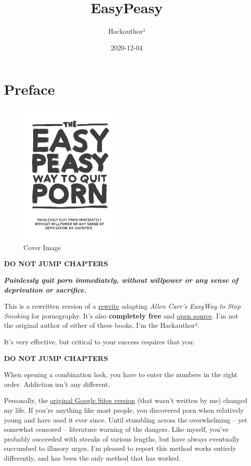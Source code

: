 \documentclass[
]{book}
\title{EasyPeasy}
\author{Hackauthor²}
\date{2020-12-04}
\begin{document}
\maketitle

{
\setcounter{tocdepth}{1}
\tableofcontents
}
\hypertarget{preface}{%
\chapter*{Preface}\label{preface}}

\begin{figure}
\centering
\includegraphics[width=0.45\textwidth,height=0.45\textheight]{images/easypeasy.jpg}
\caption{Cover Image}
\end{figure}

{\textbf{DO NOT JUMP CHAPTERS}}

\textbf{\emph{Painlessly quit porn immediately, without willpower or any sense of deprivation or sacrifice.}}

This is a rewritten version of a \href{https://sites.google.com/site/hackbookeasypeasy}{rewrite} adapting \emph{Allen Carr's EasyWay to Stop Smoking} for pornography. It's also \textbf{completely free} and \href{https://gitlab.com/snuggy/easypeasy}{open source}. I'm not the original author of either of these books, I'm the Hackauthor².

It's very effective, but critical to your success requires that you:

{\textbf{DO NOT JUMP CHAPTERS}}

When opening a combination lock, you have to enter the numbers in the right order. Addiction isn't any different.

Personally, the \href{https://sites.google.com/site/hackbookeasypeasy}{original Google Sites version} (that wasn't written by me) changed my life. If you're anything like most people, you discovered porn when relatively young and have used it ever since. Until stumbling across the overwhelming -- yet somewhat censored -- literature warning of the dangers. Like myself, you've probably succeeded with streaks of various lengths, but have always eventually succumbed to illusory urges. I'm pleased to report this method works entirely differently, and has been the only method that has worked.
\end{document}
